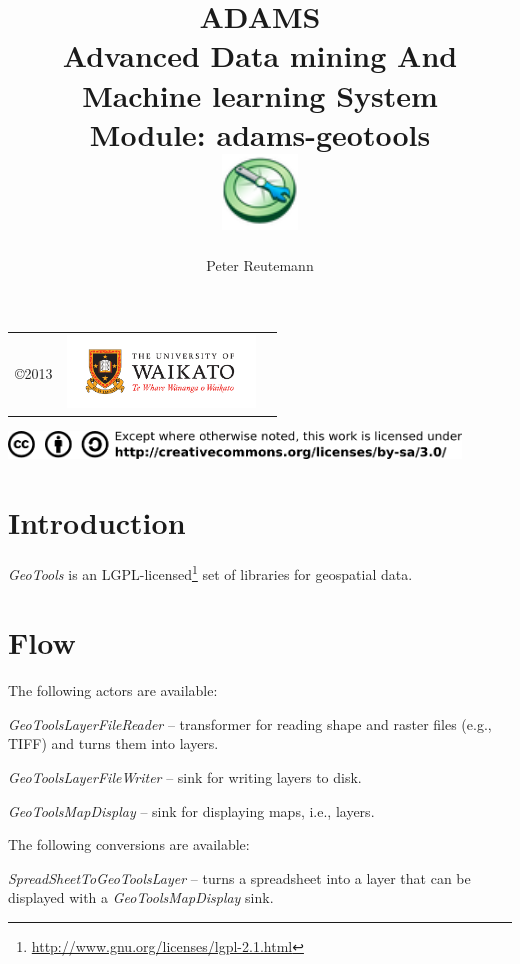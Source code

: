 \documentclass[a4paper]{book}
\title{
  \textbf{ADAMS} \\
  {\Large \textbf{A}dvanced \textbf{D}ata mining \textbf{A}nd \textbf{M}achine
  learning \textbf{S}ystem} \\
  {\Large Module: adams-geotools} \\
  \vspace{1cm}
  \includegraphics[width=2cm]{images/geotools-module.png} \\
}
\author{
  Peter Reutemann
}
\begin{document}
\begin{titlepage}
\maketitle

\thispagestyle{empty}
\center
\begin{table}[b]
	\begin{tabular}{c l l}
		\parbox[c][2cm]{2cm}{\copyright 2013} &
		\parbox[c][2cm]{5cm}{\includegraphics[width=5cm]{images/coat_of_arms.pdf}} \\
	\end{tabular}
	\includegraphics[width=12cm]{images/cc.png} \\
\end{table}

\end{titlepage}

\tableofcontents
\listoffigures

\chapter{Introduction}
\textit{GeoTools} is an LGPL-licensed\footnote{\url{http://www.gnu.org/licenses/lgpl-2.1.html}{}} 
set of libraries for geospatial data.

\chapter{Flow}
The following actors are available:
\begin{tight_itemize}
	\item \textit{GeoToolsLayerFileReader} -- transformer for reading shape 
	and raster files (e.g., TIFF) and turns them into layers.
	\item \textit{GeoToolsLayerFileWriter} -- sink for writing layers to disk.
	\item \textit{GeoToolsMapDisplay} -- sink for displaying maps, i.e., layers.
\end{tight_itemize}
The following conversions are available:
\begin{tight_itemize}
	\item \textit{SpreadSheetToGeoToolsLayer} -- turns a spreadsheet into a 
	layer that can be displayed with a \textit{GeoToolsMapDisplay} sink.
\end{tight_itemize}
\end{document}
